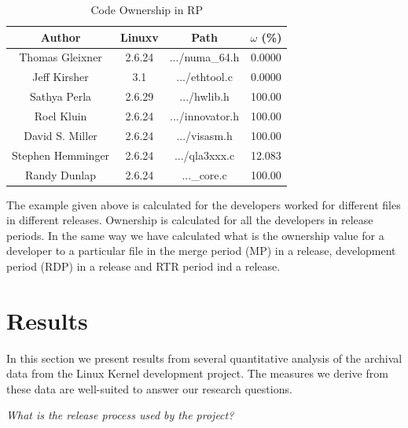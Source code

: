 \documentclass{acm_proc_article-sp}
\begin{document}
\begin{table}[ht]
\caption{Code Ownership in RP}  %
\centering 						%
\begin{tabular}{c c c c}				%
\hline\hline						%
Author 				& Linuxv		& Path				& $\omega$ (\%) \\ [0.5ex]
\hline 							%
Thomas Gleixner		& 2.6.24		& .../numa\_64.h	& 0.0000\\
Jeff Kirsher			& 3.1		& .../ethtool.c		& 0.0000\\
Sathya Perla			& 2.6.29		& .../hwlib.h		& 100.00\\
Roel Kluin			& 2.6.24		& .../innovator.h 	& 100.00\\
David S. Miller		& 2.6.24		& .../visasm.h 		& 100.00\\
Stephen Hemminger	& 2.6.24		& .../qla3xxx.c	 	& 12.083\\
Randy Dunlap			& 2.6.24		& ...\_core.c 		& 100.00\\
[1ex]							%
\hline 							%
\end{tabular}
\label{table:nonlin} 				%
\end{table}
The example given above is calculated for the developers worked for different files in different releases. Ownership is calculated for all the developers in release periods. In the same way we have calculated what is the ownership value for a developer to a particular file in the merge period (MP) in a release, development period (RDP) in a release and RTR period ind a release.

\section{Results}
In this section we present results from several quantitative analysis of the archival data from the Linux Kernel development project. The measures we derive from these data are well-suited to answer our research questions.

\textit{What is the release process used by the project?}
\end{document}
